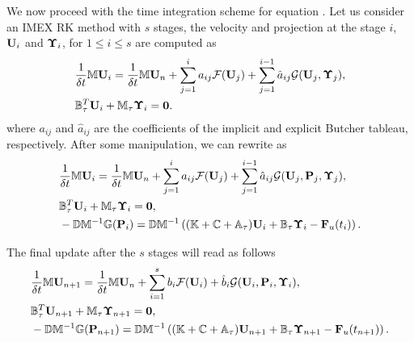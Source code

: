We now proceed with the time integration scheme for equation . Let us consider an IMEX RK method with $s$ stages, the velocity and projection at the stage $i$, ${\bf U}_i$ and $\boldsymbol{\Upsilon}_i$, for $1\leq i\leq s$ are computed as
\begin{subequations}\label{eq-C7_SRK_ueta_RK}
\begin{align}
\label{eq-C7_SRK_u_RK}
&\frac{1}{\delta t}\mathbb{M}{\bf U}_i=\frac{1}{\delta t}\mathbb{M}{\bf U}_n+\sum_{j=1}^ia_{ij}\mathcal{F}({\bf U}_j)+\sum_{j=1}^{i-1}\hat{a}_{ij}\mathcal{G}({\bf U}_j,\boldsymbol{\Upsilon}_j),\\
\label{eq-C7_SRK_eta_RK}
&\mathbb{B}_\tau^T{\bf U}_i+\mathbb{M}_\tau\boldsymbol{\Upsilon}_i=\mathbf{0}.
\end{align}
\end{subequations}
where $a_{ij}$ and $\hat{a}_{ij}$ are the coefficients of the implicit and explicit Butcher tableau, respectively.  
After some manipulation, we can rewrite  as
\begin{subequations}\label{eq-C7_SRK_upeta_RK}
\begin{align}
\label{eq-C7_SRK_upeta_RK_u}
&\frac{1}{\delta t}\mathbb{M}{\bf U}_i=\frac{1}{\delta t}\mathbb{M}{\bf U}_n+\sum_{j=1}^ia_{ij}\mathcal{F}({\bf U}_j)+\sum_{j=1}^{i-1}\hat{a}_{ij} \mathcal{G}({\bf U}_j,{\bf P}_j,\boldsymbol{\Upsilon}_j),\\
\label{eq-C7_SRK_upeta_RK_eta}
&\mathbb{B}_\tau^T{\bf U}_i+\mathbb{M}_\tau\boldsymbol{\Upsilon}_i=\mathbf{0},\\
\label{eq-C7_SRK_upeta_RK_p}
&- \mathbb{D}\mathbb{M}^{-1}\mathbb{G} ({\bf P}_i)=\mathbb{D}\mathbb{M}^{-1}\left((\mathbb{K}+\mathbb{C}+\mathbb{A}_\tau){\bf U}_i+\mathbb{B}_\tau\boldsymbol{\Upsilon}_i-{\bf F}_u(t_i)\right).
\end{align}
\end{subequations}

The final update after the $s$ stages will read as follows
\begin{subequations}\label{eq-C7_SRK_upeta_RK_n+1}
\begin{align}
\label{eq-C7_SRK_upeta_RK_u_n+1}
&\frac{1}{\delta t}\mathbb{M}{\bf U}_{n+1}=\frac{1}{\delta t}\mathbb{M}{\bf U}_n+\sum_{i=1}^sb_i\mathcal{F}({\bf U}_i)+\hat{b}_{i} \mathcal{G}({\bf U}_i,{\bf P}_i,\boldsymbol{\Upsilon}_i),\\
\label{eq-C7_SRK_upeta_RK_eta_n+1}
&\mathbb{B}_\tau^T{\bf U}_{n+1}+\mathbb{M}_\tau\boldsymbol{\Upsilon}_{n+1}=\mathbf{0},\\
\label{eq-C7_SRK_upeta_RK_p_n+1}
&- \mathbb{D}\mathbb{M}^{-1}\mathbb{G} ({\bf P}_{n+1})=\mathbb{D}\mathbb{M}^{-1}\left((\mathbb{K}+\mathbb{C}+\mathbb{A}_\tau){\bf U}_{n+1}+\mathbb{B}_\tau\boldsymbol{\Upsilon}_{n+1}-{\bf F}_u(t_{n+1})\right).
\end{align}
\end{subequations}

